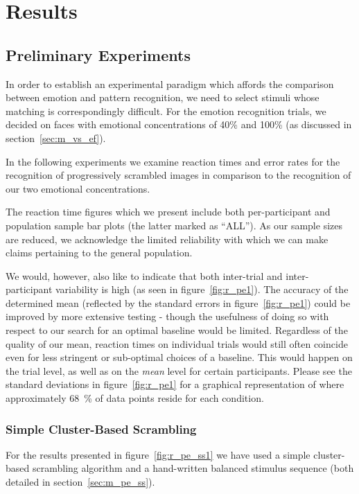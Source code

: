 



\chapter{Results}                                                                          
    \section{Preliminary Experiments}\label{sec:r_pe}
	In order to establish an experimental paradigm which affords the comparison between emotion and pattern recognition, we need to select stimuli whose matching is correspondingly difficult.
	For the emotion recognition trials, we decided on faces with emotional concentrations of 40\% and 100\% (as discussed in section~\ref{sec:m_vs_ef}).
	
	In the following experiments we examine reaction times and error rates for the recognition of progressively scrambled images in comparison to the recognition of our two emotional concentrations.
	
	The reaction time figures which we present include both per-participant and population sample bar plots (the latter marked as “ALL”).
	As our sample sizes are reduced, we acknowledge the limited reliability with which we can make claims pertaining to the general population. 
	
	We would, however, also like to indicate that both inter-trial and inter-participant variability is high (as seen in figure~\ref{fig:r_pe1}).
	The accuracy of the determined mean (reflected by the standard errors in figure~\ref{fig:r_pe1}) could be improved by more extensive testing - though the usefulness of doing so with respect to our search for an optimal baseline would be limited.
	Regardless of the quality of our mean, reaction times on individual trials would still often coincide even for less stringent or sub-optimal choices of a baseline.  
	This would happen on the trial level, as well as on the \textit{mean} level for certain participants.
	Please see the standard deviations in figure~\ref{fig:r_pe1} for a graphical representation of where approximately \SI{68}{\percent} of data points reside for each condition.
	\subsection{Simple Cluster-Based Scrambling}\label{sec:r_pe_ss}
	    For the results presented in figure~\ref{fig:r_pe_ss1} we have used a simple cluster-based scrambling algorithm and a hand-written balanced stimulus sequence 
	    (both detailed in section~\ref{sec:m_pe_ss}).
	    
